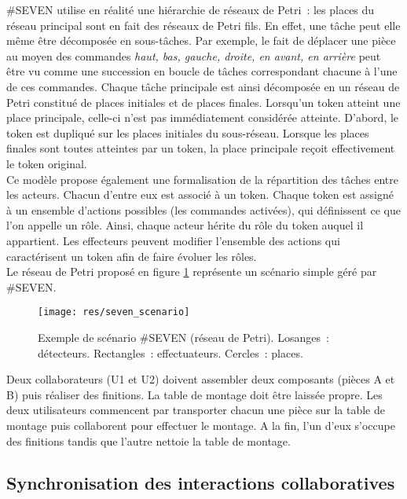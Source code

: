 \documentclass[11pt]{article}
\begin{document}
\#SEVEN utilise en réalité une hiérarchie de réseaux de Petri~: les places du réseau principal sont en fait des réseaux de Petri fils. En effet, une tâche peut elle même être décomposée en sous-tâches. Par exemple, le fait de déplacer une pièce au moyen des commandes \textit{haut, bas, gauche, droite, en avant, en arrière} peut être vu comme une succession en boucle de tâches correspondant chacune à l'une de ces commandes. Chaque tâche principale est ainsi décomposée en un réseau de Petri constitué de places initiales et de places finales. Lorsqu'un token atteint une place principale, celle-ci n'est pas immédiatement considérée atteinte. D'abord, le token est dupliqué sur les places initiales du sous-réseau. Lorsque les places finales sont toutes atteintes par un token, la place principale reçoit effectivement le token original.
\\

Ce modèle propose également une formalisation de la répartition des tâches entre les acteurs. Chacun d'entre eux est associé à un token. Chaque token est assigné à un ensemble d'actions possibles (les commandes activées), qui définissent ce que l'on appelle un rôle. Ainsi, chaque acteur hérite du rôle du token auquel il appartient. Les effecteurs peuvent modifier l'ensemble des actions qui caractérisent un token afin de faire évoluer les rôles.
\\

Le réseau de Petri proposé en figure \ref{fig:seven} représente un scénario simple géré par \#SEVEN.

\begin{figure}[!h]
\centering
\texttt{[image: res/seven\_scenario]}
\caption{\label{fig:seven}Exemple de scénario \#SEVEN (réseau de Petri). Losanges~: détecteurs. Rectangles~: effectuateurs. Cercles~: places.}
\end{figure}

Deux collaborateurs (U1 et U2) doivent assembler deux composants (pièces A et B) puis réaliser des finitions. La table de montage doit être laissée propre. Les deux utilisateurs commencent par transporter chacun une pièce sur la table de montage puis collaborent pour effectuer le montage. A la fin, l'un d'eux s'occupe des finitions tandis que l'autre nettoie la table de montage.

\subsection{Synchronisation des interactions collaboratives}
\end{document}
